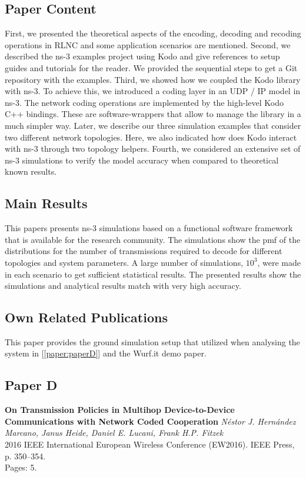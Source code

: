  \subsection*{Paper Content}
First, we presented the theoretical aspects of the encoding, decoding and recoding operations in \ac{RLNC} and some application scenarios are mentioned. Second, we described the ns-3 examples project using Kodo and give references to setup guides and tutorials for the reader. We provided the sequential steps to get a Git repository with the examples. Third, we showed how we coupled the Kodo library with ns-3. To achieve this, we introduced a coding layer in an \ac{UDP} / \ac{IP} model in ns-3. The network coding operations are implemented by the high-level Kodo C++ bindings. These are software-wrappers that allow to manage the library in a much simpler way. Later, we describe our three simulation examples that consider two different network topologies. Here, we also indicated how does Kodo interact with ns-3 through two topology helpers. Fourth, we considered an extensive set of ns-3 simulations to verify the model accuracy when compared to theoretical known results. 

\subsection*{Main Results}
This papers presents ns-3 simulations based on a functional software framework that is available for the research community. The simulations show the \ac{pmf} of the distributions for the number of transmissions required to decode for different topologies and system parameters. A large number of simulations, $10^3$, were made in each scenario to get sufficient statistical results. The presented results show the simulations and analytical results match with very high accuracy.

\subsection*{Own Related Publications}
This paper provides the ground simulation setup that utilized when analysing the system in [\ref{paper:paperD}] and the Wurf.it demo paper.

\clearpage


\subsection{Paper D}
\textbf{On Transmission Policies in Multihop Device-to-Device Communications
with Network Coded Cooperation}
\textit{N\'estor J. Hern\'andez Marcano, Janus Heide, Daniel E. Lucani, Frank H.P. Fitzek}
\\  2016 IEEE International European Wireless Conference (EW2016). IEEE Press, p. 350--354.
\\ Pages: 5.
